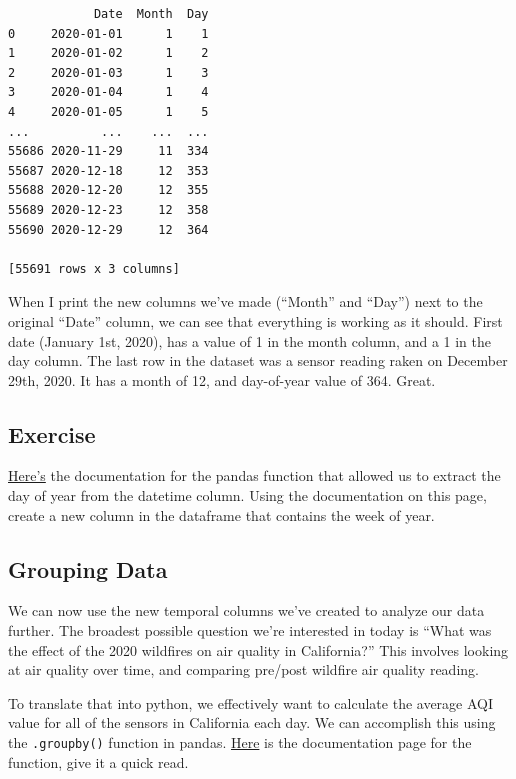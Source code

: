 \documentclass[
  letterpaper,
  DIV=11,
  numbers=noendperiod]{scrreprt}
\begin{document}
\begin{verbatim}
            Date  Month  Day
0     2020-01-01      1    1
1     2020-01-02      1    2
2     2020-01-03      1    3
3     2020-01-04      1    4
4     2020-01-05      1    5
...          ...    ...  ...
55686 2020-11-29     11  334
55687 2020-12-18     12  353
55688 2020-12-20     12  355
55689 2020-12-23     12  358
55690 2020-12-29     12  364

[55691 rows x 3 columns]
\end{verbatim}

When I print the new columns we've made (``Month'' and ``Day'') next to
the original ``Date'' column, we can see that everything is working as
it should. First date (January 1st, 2020), has a value of 1 in the month
column, and a 1 in the day column. The last row in the dataset was a
sensor reading raken on December 29th, 2020. It has a month of 12, and
day-of-year value of 364. Great.

\hypertarget{exercise-4}{%
\subsection{Exercise}\label{exercise-4}}

\href{https://pandas.pydata.org/docs/reference/api/pandas.Series.dt.dayofyear.html}{Here's}
the documentation for the pandas function that allowed us to extract the
day of year from the datetime column. Using the documentation on this
page, create a new column in the dataframe that contains the week of
year.

\hypertarget{grouping-data}{%
\subsection{Grouping Data}\label{grouping-data}}

We can now use the new temporal columns we've created to analyze our
data further. The broadest possible question we're interested in today
is ``What was the effect of the 2020 wildfires on air quality in
California?'' This involves looking at air quality over time, and
comparing pre/post wildfire air quality reading.

To translate that into python, we effectively want to calculate the
average AQI value for all of the sensors in California each day. We can
accomplish this using the \texttt{.groupby()} function in pandas.
\href{https://pandas.pydata.org/docs/reference/api/pandas.DataFrame.groupby.html}{Here}
is the documentation page for the function, give it a quick read.
\end{document}
